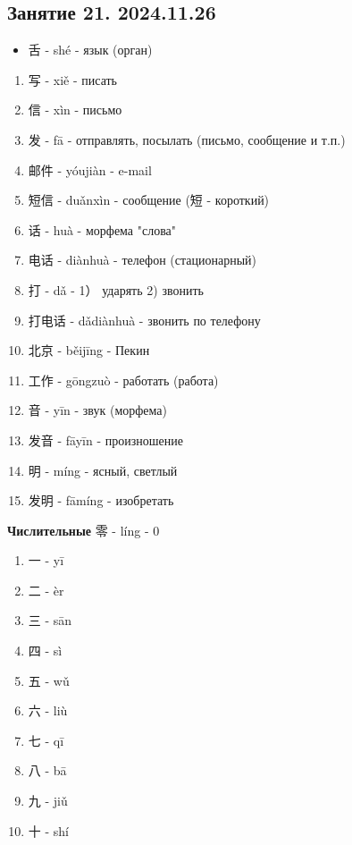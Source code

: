 \LARGE
\newpage
\subsection{Занятие 21. 2024.11.26}
\begin{newgraphems}
	\begin{itemize}\hfill
		\item 舌 - shé - язык (орган)
	\end{itemize}
\end{newgraphems}
\begin{newwords}\hfill
	\begin{enumerate}
		\item 写 - xiě - писать
		\item 信 - xìn - письмо
		\item 发 - fā - отправлять, посылать (письмо, сообщение и т.п.)
		\item 邮件 - yóujiàn - e-mail
		\item 短信 - duǎnxìn - сообщение (短 - короткий)
		\item 话 - huà - морфема "слова"
		\item 电话 - diànhuà - телефон (стационарный)
		\item 打 - dǎ - 1） ударять  2) звонить
		\item 打电话 - dǎdiànhuà - звонить по телефону
		\item 北京 - běijīng - Пекин
		\item 工作 - gōngzuò - работать (работа)
		\item 音 - yīn -	 звук (морфема)
		\item 发音 - fāyīn - произношение
		\item 明 - míng - ясный, светлый
		\item 发明 - fāmíng - изобретать
	\end{enumerate}
\end{newwords}
\newpage
\textbf{Числительные}\hfill\break
零 - líng - 0
\begin{enumerate}
	\item 一 - yī
	\item 二 - èr
	\item 三 - sān
	\item 四 - sì
	\item 五 - wǔ
	\item 六 - liù
	\item 七 - qī
	\item 八 - bā
	\item 九 - jiǔ
	\item 十 - shí
\end{enumerate}
